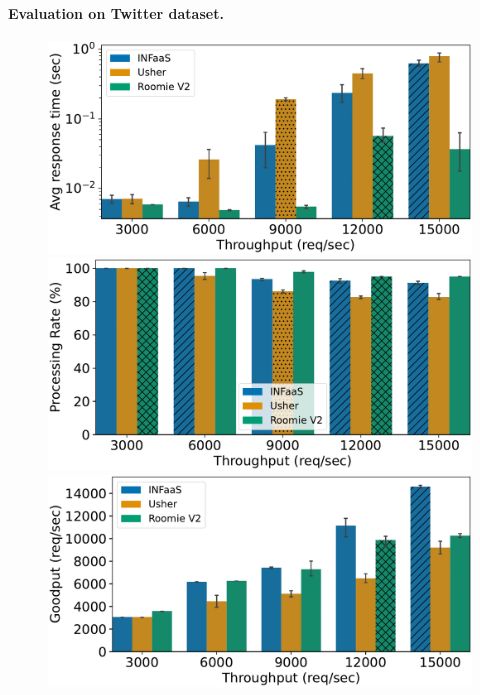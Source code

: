 \paragraph{Evaluation on Twitter dataset.}

\begin{figure}
	\begin{minipage}[t]{.24\linewidth}
		\centering
		\includegraphics[width=\linewidth]{chapters/roomie/images/NvidiaA100/twitter-all-models/response_time.pdf}
	\end{minipage}
	\hfill
	\begin{minipage}[t]{.24\linewidth}
		\centering
		\includegraphics[width=\linewidth]{chapters/roomie/images/NvidiaA100/twitter-all-models/normalized.pdf}
	\end{minipage}
	\hfill
	\begin{minipage}[t]{.24\linewidth}
		\centering
		\includegraphics[width=\linewidth]{chapters/roomie/images/NvidiaA100/twitter-all-models/goodput.pdf}

\end{minipage}
\end{figure}
